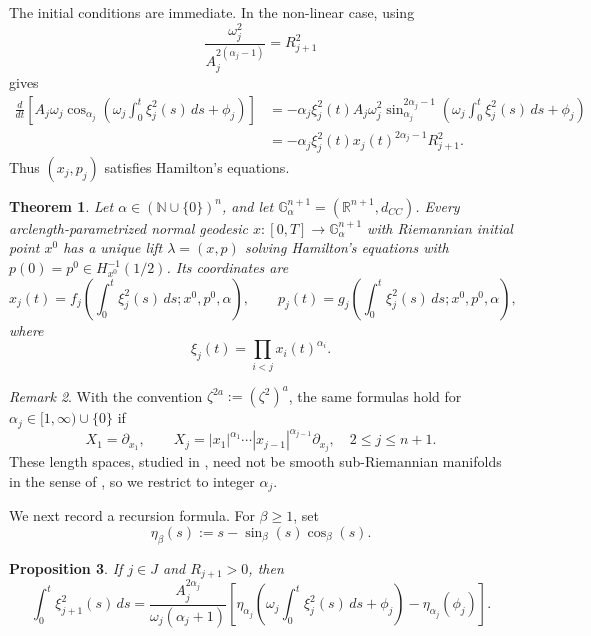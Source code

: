 \documentclass[12pt]{amsart}
\numberwithin{equation}{section}
\theoremstyle{plain}
\newtheorem{theorem}{Theorem}[section]
\newtheorem{proposition}[theorem]{Proposition}%
\theoremstyle{definition}
\theoremstyle{remark}
\newtheorem{remark}[theorem]{Remark}%
\begin{document}
The initial conditions are immediate. In the non-linear case, using
\[
    \frac{\omega_j^2}{A_j^{2(\alpha_j-1)}}=R_{j+1}^2
\]
gives
\begin{align*}
    \frac{d}{dt}
    \left[
        A_j\omega_j
        \cos_{\alpha_j}
        \left(
        \omega_j\int_0^t \xi_j^2(s)\,ds+\phi_j
        \right)
        \right]
     & =
    -\alpha_j\xi_j^2(t)A_j\omega_j^2
    \sin_{\alpha_j}^{2\alpha_j-1}
    \left(
    \omega_j\int_0^t \xi_j^2(s)\,ds+\phi_j
    \right)
    \\
     & =
    -\alpha_j\xi_j^2(t)x_j(t)^{2\alpha_j-1}R_{j+1}^2.
\end{align*}
Thus \((x_j,p_j)\) satisfies Hamilton's equations.

\begin{theorem}\label{Solution to Hamilton}
    Let \(\alpha\in(\mathbb N\cup\{0\})^n\), and let
    \(\mathbb G_\alpha^{n+1}=(\mathbb R^{n+1},d_{CC})\). Every arclength-parametrized normal
    geodesic \(x:[0,T]\to\mathbb G_\alpha^{n+1}\) with Riemannian initial point \(x^0\) has a
    unique lift \(\lambda=(x,p)\) solving Hamilton's equations with
    \(p(0)=p^0\in H_{x^0}^{-1}(1/2)\). Its coordinates are
    \begin{equation}\label{e.coordinates}
        x_j(t)
        =
        f_j\left(\int_0^t \xi_j^2(s)\,ds;x^0,p^0,\alpha\right),
        \qquad
        p_j(t)
        =
        g_j\left(\int_0^t \xi_j^2(s)\,ds;x^0,p^0,\alpha\right),
    \end{equation}
    where
    \[
        \xi_j(t)=\prod_{i<j}x_i(t)^{\alpha_i}.
    \]
\end{theorem}

\begin{remark}
    With the convention \(\zeta^{2a}:=(\zeta^2)^a\), the same formulas hold for
    \(\alpha_j\in[1,\infty)\cup\{0\}\) if
    \[
        X_1=\partial_{x_1},
        \qquad
        X_j=|x_1|^{\alpha_1}\cdots |x_{j-1}|^{\alpha_{j-1}}\partial_{x_j},
        \quad 2\leq j\leq n+1.
    \]
    These length spaces, studied in \cite{WuJang-Mei2015, Borza2022}, need not be smooth
    sub-Riemannian manifolds in the sense of \cite{AgrachevBarilariBoscainBook2020}, so we restrict to integer \(\alpha_j\).
\end{remark}

We next record a recursion formula. For \(\beta\geq 1\), set
\[
    \eta_\beta(s):=s-\sin_\beta(s)\cos_\beta(s).
\]

\begin{proposition}\label{Recursion Result}
    If \(j\in J\) and \(R_{j+1}>0\), then
    \begin{equation}\label{e.recursion-integral}
        \int_0^t \xi_{j+1}^2(s)\,ds
        =
        \frac{A_j^{2\alpha_j}}{\omega_j(\alpha_j+1)}
        \left[
            \eta_{\alpha_j}
            \left(
            \omega_j\int_0^t \xi_j^2(s)\,ds+\phi_j
            \right)
            -
            \eta_{\alpha_j}(\phi_j)
            \right].
    \end{equation}
\end{proposition}
\end{document}
